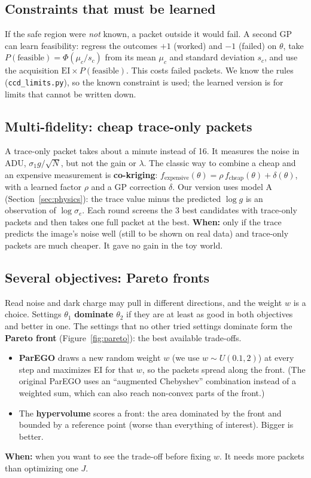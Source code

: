 \documentclass[11pt]{article}
\newcommand{\code}[1]{\texttt{#1}}
\begin{document}
\subsection{Constraints that must be learned}
If the safe region were \emph{not} known, a packet outside it would fail. A second GP can learn feasibility: regress the outcomes
$+1$ (worked) and $-1$ (failed) on $\theta$, take $P(\text{feasible}) = \Phi(\mu_c/s_c)$ from its mean $\mu_c$ and standard
deviation $s_c$, and use the acquisition $\mathrm{EI}\times P(\text{feasible})$. This costs failed packets. We know the rules
(\code{ccd\_limits.py}), so the known constraint is used; the learned version is for limits that cannot be written down.

\subsection{Multi-fidelity: cheap trace-only packets}
A trace-only packet takes about a minute instead of 16. It measures the noise in ADU, $\sigma_1 g/\sqrt N$, but not the gain or
$\lambda$. The classic way to combine a cheap and an expensive measurement is \textbf{co-kriging}:
$f_\text{expensive}(\theta) = \rho\,f_\text{cheap}(\theta) + \delta(\theta)$, with a learned factor $\rho$ and a GP correction
$\delta$. Our version uses model A (Section~\ref{sec:physics}): the trace value minus the predicted $\log g$ is an observation of
$\log\sigma_e$. Each round screens the 3 best candidates with trace-only packets and then takes one full packet at the best.
\textbf{When:} only if the trace predicts the image's noise well (still to be shown on real data) and trace-only packets are much
cheaper. It gave no gain in the toy world.

\subsection{Several objectives: Pareto fronts}
Read noise and dark charge may pull in different directions, and the weight $w$ is a choice. Settings $\theta_1$
\textbf{dominate} $\theta_2$ if they are at least as good in both objectives and better in one. The settings that no other tried
settings dominate form the \textbf{Pareto front} (Figure~\ref{fig:pareto}): the best available trade-offs.
\begin{itemize}
\item \textbf{ParEGO} draws a new random weight $w$ (we use $w \sim U(0.1, 2)$) at every step and maximizes EI for that $w$, so
  the packets spread along the front. (The original ParEGO uses an ``augmented Chebyshev'' combination instead of a weighted sum,
  which can also reach non-convex parts of the front.)
\item The \textbf{hypervolume} scores a front: the area dominated by the front and bounded by a reference point (worse than
  everything of interest). Bigger is better.
\end{itemize}
\textbf{When:} when you want to see the trade-off before fixing $w$. It needs more packets than optimizing one $J$.
\end{document}
